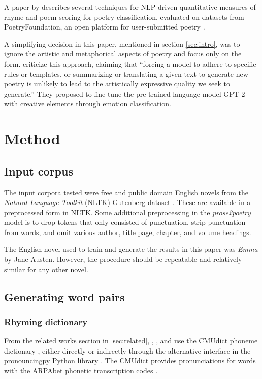 \documentclass[11pt,a4paper]{article}
\begin{document}
A paper by \citet{keswarani} describes several techniques for NLP-driven quantitative measures of rhyme and poem scoring for poetry classification, evaluated on datasets from PoetryFoundation, an open platform for user-submitted poetry \cite*{poetryfoundation}.

A simplifying decision in this paper, mentioned in section \ref{sec:intro}, was to ignore the artistic and metaphorical aspects of poetry and focus only on the form. \citet{bena2020introducing} criticize this approach, claiming that ``forcing a model to adhere to specific rules or templates, or summarizing or translating a given text to generate new poetry is unlikely to lead to the artistically expressive quality we seek to generate.'' They proposed to fine-tune the pre-trained language model GPT-2 with creative elements through emotion classification.

\section{Method}
\label{sec:method}

\subsection{Input corpus}

The input corpora tested were free and public domain English novels from the \textit{Natural Language Toolkit} (NLTK) Gutenberg dataset \cite[Chapter~2]{gutenbergnltk}. These are available in a preprocessed form in NLTK. Some additional preprocessing in the \textit{prose2poetry} model is to drop tokens that only consisted of punctuation, strip punctuation from words, and omit various author, title page, chapter, and volume headings.

The English novel used to train and generate the results in this paper was \textit{Emma} by Jane Austen. However, the procedure should be repeatable and relatively similar for any other novel.

\subsection{Generating word pairs}

\subsubsection{Rhyming dictionary}

From the related works section in \ref{sec:related}, \citet{keswarani}, \citet{cole}, and \citet{hopkins-kiela-2017} use the CMUdict phoneme dictionary \cite{cmudict}, either directly or indirectly through the alternative interface in the pronouncingpy Python library \cite{pronouncingpy}. The CMUdict provides pronunciations for words with the ARPAbet phonetic transcription codes \cite[Chapter~27]{jurafsky}.
\end{document}
